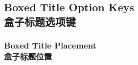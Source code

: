 \subsection{Boxed Title Option Keys\\盒子标题选项键}\label{subsec:skinboxedtitle}
\subsubsection{Boxed Title Placement\\盒子标题位置}



